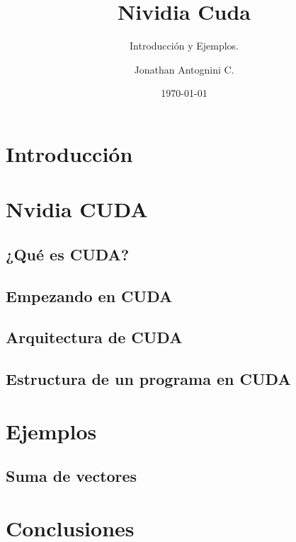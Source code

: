 \documentclass{beamer}
\title{Nividia Cuda}
\subtitle{Introducción y Ejemplos.}
\author{Jonathan Antognini C.}
\institute[]{Universidad Técnica Federico Santa María}
\date{\today}
\begin{document}
    \frame{\titlepage}
    \frame{\tableofcontents}
	\section{Introducción}								%
	\section{Nvidia CUDA}								%
		\subsection{¿Qué es CUDA?}						%
		\subsection{Empezando en CUDA}						%
		\subsection{Arquitectura de CUDA}					%
		\subsection{Estructura de un programa en CUDA}				
				
				
			
	\section{Ejemplos}
		\subsection{Suma de vectores}
			
	\section{Conclusiones}
		
	
\end{document}
